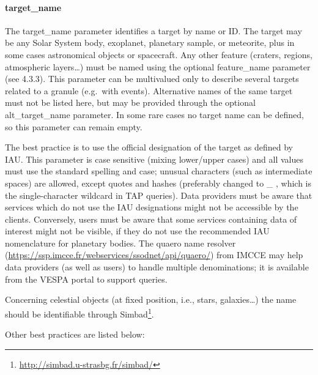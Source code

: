 \documentclass[11pt,a4paper]{ivoa}
\begin{document}
\paragraph{target\_name}

The target\_name parameter identifies a target by name or ID. The
target may be any Solar System body, exoplanet, planetary sample, or
meteorite, plus in some cases astronomical objects or spacecraft. Any
other feature (craters, regions, atmospheric layers…) must be named
using the optional feature\_name parameter (see 4.3.3). This parameter
can be multivalued only to describe several targets related to a granule
(e.g.\ with events). Alternative names of the same target must not be
listed here, but may be provided through the optional alt\_target\_name
parameter. In some rare cases no target name can be defined, so this
parameter can remain empty.

The best practice is to use the official designation of the target as
defined by IAU. This parameter is case sensitive (mixing lower/upper
cases) and all values must use the standard spelling and case; unusual
characters (such as intermediate spaces) are allowed, except quotes
and hashes (preferably changed to \_ , which is the single-character
wildcard in TAP queries). Data providers must be aware that services
which do not use the IAU designations might not be accessible by the
clients. Conversely, users must be aware that some services containing
data of interest might not be visible, if they do not use the recommended
IAU nomenclature for planetary bodies. The quaero name resolver
(\url{https://ssp.imcce.fr/webservices/ssodnet/api/quaero/})
from IMCCE may help data providers (as well as users) to handle multiple
denominations; it is available from the VESPA portal to support queries.

Concerning celestial objects (at fixed position, i.e., stars,
galaxies…) the name should be identifiable through
Simbad\footnote{\url{http://simbad.u-strasbg.fr/simbad/}}.

Other best practices are listed below:
\end{document}
